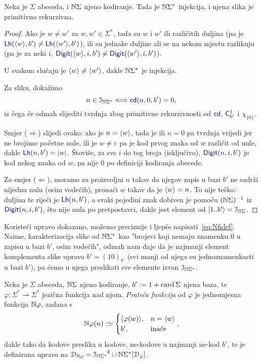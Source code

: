 \begin{propozicija}\label{pp:injkr}
Neka je $\Sigma$ abeceda, i ${\mathbb N}\Sigma$ njeno kodiranje. Tada je ${\mathbb N}\Sigma^*$ injekcija, i njena slika je primitivno rekurzivna.
\end{propozicija}
\begin{proof}
Ako je $w\not=w'$ za $w,w'\in\Sigma^*$, tada su $w$ i $w'$ ili različitih duljina (pa je $\f{Lh}(\kr w,b')\not=\f{Lh}(\kr{w'},b')$), ili su jednake duljine ali se na nekom mjestu razlikuju (pa je za neki $i$, $\f{Digit}(\kr w,i,b')\not=\f{Digit}(\kr{w'},i,b')$).

U svakom slučaju je $\langle w\rangle\not=\langle w'\rangle$, dakle ${\mathbb N}\Sigma^*$ je injekcija.

Za sliku, dokažimo
\begin{equation}\label{eq:imNSzprn}
    n\in\im{\N\Sigma^*}\Longleftrightarrow\f{cd}(n,0,b')=0\text,
\end{equation}
iz čega će odmah slijediti tvrdnja zbog primitivne rekurzivnosti od $\f{cd}$, $\f C_{b'}^1$ i $\chi_{\{0\}}$.

Smjer ($\Rightarrow$) slijedi ovako: ako je $n=\langle w\rangle$, tada je ili $n=0$ pa tvrdnja vrijedi jer ne brojimo početne nule, ili je $w\not=\varepsilon$ pa je kod prvog znaka od $w$ različit od nule, dakle $\f{Lh}(n,b')=\left|w\right|$. Štoviše, za sve $i$ do tog broja (isključivo), $\f{Digit}(n,i,b')$ je kod nekog znaka od $w$, pa nije $0$ po definiciji kodiranja abecede.

Za smjer ($\Leftarrow$), moramo za proizvoljni $n$ takav da njegov zapis u bazi $b'$ ne sadrži nijednu nulu (osim vodećih), pronaći $w$ takav da je $\langle w\rangle=n$. To nije teško: duljina te riječi je $\f{Lh}(n,b')$, a svaki pojedini znak dobiven je pomoću $({\mathbb N}\Sigma)^{-1}$ iz $\f{Digit}(n,i,b')$, što nije nula po pretpostavci, dakle jest element od $[1..b'\rangle=\mathcal I_{{\mathbb N}\Sigma}$.
\end{proof}

Koristeći upravo dokazano, možemo preciznije i ljepše napisati~\eqref{eq:Nfidef}. Naime, karakterizacija slike od ${\mathbb N}\Sigma^*$ kao "brojevi koji nemaju znamenku $0$ u zapisu u bazi $b'$, osim vodećih", odmah nam daje da je najmanji element komplementa slike upravo $b'=(10)_{b'}$ (svi manji od njega su jednoznamenkasti u bazi $b'$), pa ćemo u njega preslikati sve elemente izvan $\mathcal I_{{\mathbb N}\Sigma^*}$.

\begin{definicija}\label{def:kodfi}
Neka je $\Sigma$ abeceda, ${\mathbb N}\Sigma$ njeno kodiranje, $b':=1+\operatorname{card}\Sigma$ njena baza, te $\varphi\colon\Sigma^*\rightharpoonup\Sigma^*$ jezična funkcija nad njom. \emph{Prateća funkcija} od $\varphi$ je jednomjesna  funkcija ${\mathbb N}\varphi$, zadana s
\begin{equation}\label{eq:kodfidef}
    {\mathbb N}\varphi(n):\simeq\begin{cases}
    \langle\varphi(w)\rangle,&n=\langle w\rangle\\
    b',&\text{inače}
    \end{cases}\text,
\end{equation}
dakle tako da kodove preslika u kodove, ne-kodove u najmanji ne-kod $b'$, te je definirana upravo na $\mathcal D_{{\mathbb N}\varphi}={\mathcal I_{{\mathbb N}\Sigma^*}}\sp{{\scriptscriptstyle\complement}}\cup{\mathbb N}\Sigma^*[\mathcal D_{\varphi}]$.
\end{definicija}

